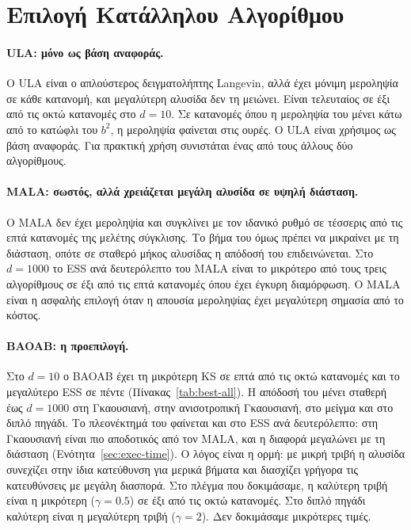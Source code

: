 \section{Επιλογή Κατάλληλου Αλγορίθμου}
\label{sec:concl-when}

\paragraph{ULA: μόνο ως βάση αναφοράς.}
Ο ULA είναι ο απλούστερος δειγματολήπτης Langevin, αλλά έχει μόνιμη μεροληψία σε κάθε
κατανομή, και μεγαλύτερη αλυσίδα δεν τη μειώνει. Είναι τελευταίος σε έξι από τις οκτώ
κατανομές στο $d=10$. Σε κατανομές όπου η μεροληψία του μένει κάτω από το κατώφλι του
$b^2$, η μεροληψία φαίνεται στις ουρές. Ο ULA είναι χρήσιμος ως βάση αναφοράς. Για
πρακτική χρήση συνιστάται ένας από τους άλλους δύο αλγορίθμους.

\paragraph{MALA: σωστός, αλλά χρειάζεται μεγάλη αλυσίδα σε υψηλή διάσταση.}
Ο MALA δεν έχει μεροληψία και συγκλίνει με τον ιδανικό ρυθμό σε τέσσερις από τις
επτά κατανομές της μελέτης σύγκλισης. Το βήμα του όμως πρέπει να
μικραίνει με τη διάσταση, οπότε σε σταθερό μήκος αλυσίδας η απόδοσή του επιδεινώνεται. Στο
$d=1000$ το ESS ανά δευτερόλεπτο του MALA είναι το μικρότερο από τους τρεις αλγορίθμους σε έξι από τις
επτά κατανομές όπου έχει έγκυρη διαμόρφωση. Ο MALA είναι η ασφαλής
επιλογή όταν η απουσία μεροληψίας έχει μεγαλύτερη σημασία από το κόστος.

\paragraph{BAOAB: η προεπιλογή.}
Στο $d=10$ ο BAOAB έχει τη μικρότερη KS σε επτά από τις οκτώ κατανομές και το
μεγαλύτερο ESS σε πέντε (Πίνακας~\ref{tab:best-all}). Η απόδοσή του μένει σταθερή έως
$d=1000$ στη Γκαουσιανή, στην ανισοτροπική Γκαουσιανή, στο μείγμα και στο διπλό πηγάδι. Το πλεονέκτημά του φαίνεται και στο
ESS ανά δευτερόλεπτο: στη Γκαουσιανή είναι πιο αποδοτικός από τον MALA, και η
διαφορά μεγαλώνει με τη διάσταση (Ενότητα~\ref{sec:exec-time}). Ο
λόγος είναι η ορμή: με μικρή τριβή η αλυσίδα συνεχίζει στην ίδια κατεύθυνση για
μερικά βήματα και διασχίζει γρήγορα τις κατευθύνσεις με μεγάλη διασπορά. Στο πλέγμα που δοκιμάσαμε, η καλύτερη
τριβή είναι η μικρότερη ($\gamma = 0.5$) σε έξι από τις οκτώ κατανομές. Στο διπλό πηγάδι
καλύτερη είναι η μεγαλύτερη τριβή ($\gamma = 2$). Δεν δοκιμάσαμε μικρότερες τιμές.

